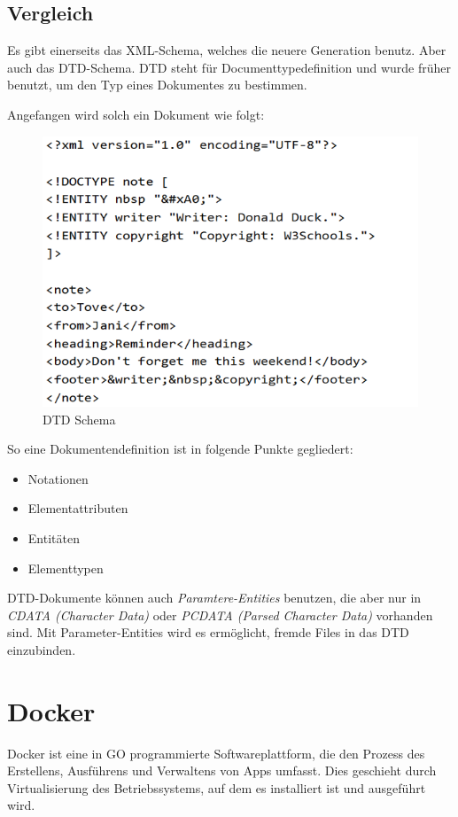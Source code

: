 \pagebreak
\subsection{Vergleich}
Es gibt einerseits das XML-Schema, welches die neuere Generation benutz. Aber auch das DTD-Schema.
DTD steht für Documenttypedefinition und wurde früher benutzt, um den Typ eines Dokumentes zu bestimmen.

Angefangen wird solch ein Dokument wie folgt:

\begin{figure}[htp]
    \author{Bozidar Spasenovic}
    \centering
    \includegraphics[scale=0.60]{pics/dtd-schema.png}
    \caption{DTD Schema}
    \label{fig:impl:DTD-Schema}
\end{figure}   


\cite{DTD-Schema}
So eine Dokumentendefinition ist in folgende Punkte gegliedert:
\begin{itemize}
    \item Notationen
    \item Elementattributen
    \item Entitäten
    \item Elementtypen
\end{itemize}

DTD-Dokumente können auch \textit{Paramtere-Entities} benutzen, die aber nur in \textit{CDATA (Character Data)} 
oder \textit{PCDATA (Parsed Character Data)} vorhanden sind.
Mit Parameter-Entities wird es ermöglicht, fremde Files in das DTD einzubinden.


\section{Docker}
\author{Bozidar Spasenovic}
Docker ist eine in GO programmierte Softwareplattform, die den Prozess des Erstellens, Ausführens und Verwaltens von Apps umfasst.
Dies geschieht durch Virtualisierung des Betriebssystems, auf dem es installiert ist und ausgeführt wird. 
